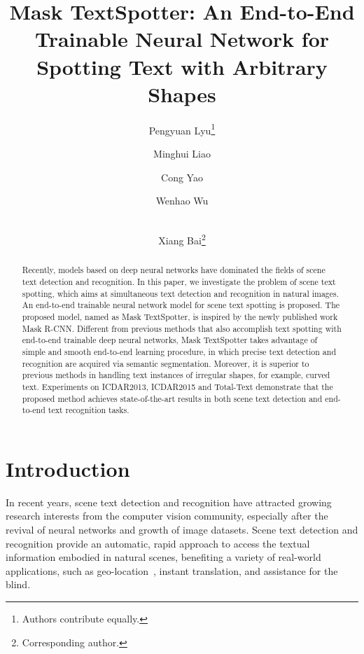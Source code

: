 \documentclass[runningheads]{llncs}
\makeatletter
\newcommand{\printfnsymbol}[1]{\textsuperscript{\@fnsymbol{#1}}}
\makeatother
\begin{document}
\title{Mask TextSpotter: An End-to-End Trainable Neural Network for Spotting Text with Arbitrary Shapes} 


\author{Pengyuan Lyu\thanks{Authors contribute equally.} \and
Minghui Liao\printfnsymbol{1} \and
Cong Yao \and
Wenhao Wu \and \\
Xiang Bai\thanks{Corresponding author.}}


\maketitle              \begin{abstract}
Recently, models based on deep neural networks have dominated the fields of scene text detection and recognition. In this paper, we investigate the problem of scene text spotting, which aims at simultaneous text detection and recognition in natural images. An end-to-end trainable neural network model for scene text spotting is proposed. The proposed model, named as Mask TextSpotter, is inspired by the newly published work Mask R-CNN. Different from previous methods that also accomplish text spotting with end-to-end trainable deep neural networks, Mask TextSpotter takes advantage of simple and smooth end-to-end learning procedure, in which precise text detection and recognition are acquired via semantic segmentation. Moreover, it is superior to previous methods in handling text instances of irregular shapes, for example, curved text. Experiments on ICDAR2013, ICDAR2015 and Total-Text demonstrate that the proposed method achieves state-of-the-art results in both scene text detection and end-to-end text recognition tasks.

\end{abstract}


\section{Introduction}
In recent years, scene text detection and recognition have attracted growing research interests from the computer vision community, especially after the revival of neural networks and growth of image datasets. Scene text detection and recognition provide an automatic, rapid approach to access the textual information embodied in natural scenes, benefiting a variety of real-world applications, such as geo-location~\cite{zhu2018cascaded}, instant translation, and assistance for the blind.  
\end{document}

